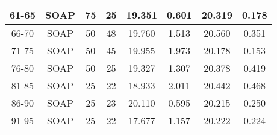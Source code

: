 \documentclass[12pt]{article}
\begin{document}
\begin{appendices}
\begin{table}[H]
\begin{tabular}{|c|c|c|c|c|c|c|c|}
		61-65	& SOAP	& 75	& 25	& 19.351	& 0.601	& 20.319	& 0.178	\\ \hline
		66-70	& SOAP	& 50	& 48	& 19.760	& 1.513	& 20.560	& 0.351	\\ \hline
		71-75	& SOAP	& 50	& 45	& 19.955	& 1.973	& 20.178	& 0.153	\\ \hline
		76-80	& SOAP	& 50	& 25	& 19.327	& 1.307	& 20.378	& 0.419	\\ \hline
		81-85	& SOAP	& 25	& 22	& 18.933	& 2.011	& 20.442	& 0.468	\\ \hline
		86-90	& SOAP	& 25	& 23	& 20.110	& 0.595	& 20.215	& 0.250	\\ \hline
		91-95	& SOAP	& 25	& 22	& 17.677	& 1.157	& 20.222	& 0.224	\\ \hline
	\end{tabular}
	\label{tab:app_gen_labels}
\end{table}


\end{appendices}
\end{document}
